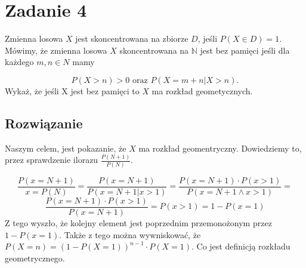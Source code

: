 \section{Zadanie 4}
Zmienna losowa \(X\) jest skoncentrowana na zbiorze \(D\), jeśli \(P(X \in D) = 1\). Mówimy, że zmienna losowa \(X\) skoncentrowana na \(\mathbb{N}\) jest bez pamięci jeśli dla każdego \(m, n \in N\) mamy

\[
	P(X > n) > 0 \text{ oraz } P(X = m + n |  X > n).
\]
Wykaż, że jeśli X jest bez pamięci to \(X\) ma rozkład geometycznych.

\subsection*{Rozwiązanie}
Naszym celem, jest pokazanie, że \(X\) ma rozkład geomentryczny. Dowiedziemy to, przez sprawdzenie ilorazu \(\frac{P(N+1)}{P(N)}\).

\[
	\frac{P(x=N+1)}{x=P(N)} = \frac{P(x=N+1)}{P(x=N+1 | x > 1)} =  \frac{P(x=N+1) \cdot P(x > 1)}{P(x = N+1 \wedge x > 1)} =
\]
\[
	\frac{P(x=N+1) \cdot P(x > 1)}{P(x=N+1)} = P(x > 1) = 1 - P(x = 1)
\]
Z tego wyszło, że kolejny element jest poprzednim przemonożonym przez \(1 - P(x = 1)\). Także z tego można wywniskować, że \(P(X = n) = (1-P(X=1))^{n-1} \cdot P(X = 1)\). Co jest definicją rozkładu geometrycznego.
